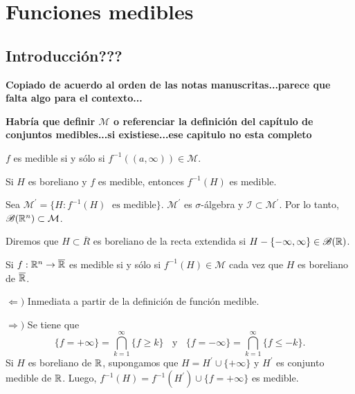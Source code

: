 \chapter{Funciones medibles
}

\section{Introducci\'on???}

\textbf{ Copiado de acuerdo al orden de las notas manuscritas...parece que falta algo para el contexto...}

\textbf{Habr\'ia que definir $\mathcal{M}$ o referenciar la definici\'on del cap\'itulo  de conjuntos medibles...si existiese...ese  capitulo no esta completo}

\begin{definicion}{}
$f$ es medible si y s\'olo si $f^{-1}((a,\infty)) \in \mathcal{M}$. 
\end{definicion}

\begin{teorema}{}
Si $H$ es boreliano y $f$ es medible, entonces $f^{-1}(H)$ es medible.
\end{teorema}

\begin{demo}{}
Sea $\mathcal{M}^{'}=\{ H: f^{-1}(H)\;\mbox{ es medible}\}$.
$\mathcal{M}^{'}$ es $\sigma$-\'algebra y $\mathscr{I}\subset \mathcal{M}^{'}$.
Por lo tanto, $\mathscr{B}(\mathbb{R}^n) \subset \mathcal{M}$.
\end{demo}

\begin{definicion}{}
Diremos que $H \subset \overline{R}$ es boreliano de la recta extendida si $H-\{ -\infty, \infty\} \in \mathscr{B}(\mathbb{R})$.
\end{definicion}

\begin{teorema}{}
Si $f:\mathbb{R}^n \to \overline{\mathbb{R}}$ es medible si y s\'olo si $f^{-1}(H) \in \mathcal{M}$ cada vez que $H$ es boreliano de $\overline{\mathbb{R}}$.
\end{teorema}

\begin{demo}
$\Leftarrow)$ Inmediata a partir de la definici\'on de funci\'on medible.

$\Rightarrow)$ Se tiene que 
\[
\{f=+\infty\}=\bigcap\limits_{k=1}^{\infty} \{f \geq k\}
\;\;\mbox{ y }\;\;
\{f=-\infty\}=\bigcap\limits_{k=1}^{\infty} \{f \leq -k\}.
\]
Si $H$ es boreliano de $\mathbb{R}$, supongamos que $H=H^{'}\cup \{+\infty\}$ y $H^{'}$ es conjunto medible de $\mathbb{R}$.
Luego, $f^{-1}(H)=f^{-1}(H^{'})\cup \{f=+\infty\}$ es medible.
\end{demo}



